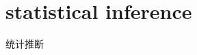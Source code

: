 \documentclass[../main.tex]{subfiles}
\begin{document}
\section{statistical inference}
统计推断
\end{document}

